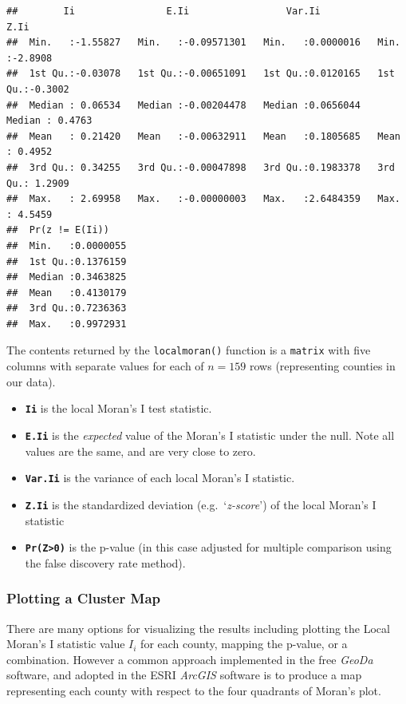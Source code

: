 \documentclass[
]{book}
\providecommand{\tightlist}{%
  \setlength{\itemsep}{0pt}\setlength{\parskip}{0pt}}
\begin{document}
\begin{verbatim}
##        Ii                E.Ii                 Var.Ii               Z.Ii        
##  Min.   :-1.55827   Min.   :-0.09571301   Min.   :0.0000016   Min.   :-2.8908  
##  1st Qu.:-0.03078   1st Qu.:-0.00651091   1st Qu.:0.0120165   1st Qu.:-0.3002  
##  Median : 0.06534   Median :-0.00204478   Median :0.0656044   Median : 0.4763  
##  Mean   : 0.21420   Mean   :-0.00632911   Mean   :0.1805685   Mean   : 0.4952  
##  3rd Qu.: 0.34255   3rd Qu.:-0.00047898   3rd Qu.:0.1983378   3rd Qu.: 1.2909  
##  Max.   : 2.69958   Max.   :-0.00000003   Max.   :2.6484359   Max.   : 4.5459  
##  Pr(z != E(Ii))     
##  Min.   :0.0000055  
##  1st Qu.:0.1376159  
##  Median :0.3463825  
##  Mean   :0.4130179  
##  3rd Qu.:0.7236363  
##  Max.   :0.9972931
\end{verbatim}

The contents returned by the \texttt{localmoran()} function is a \texttt{matrix} with five columns with separate values for each of \(n=159\) rows (representing counties in our data).

\begin{itemize}
\tightlist
\item
  \textbf{\texttt{Ii}} is the local Moran's I test statistic.\\
\item
  \textbf{\texttt{E.Ii}} is the \emph{expected} value of the Moran's I statistic under the null. Note all values are the same, and are very close to zero.
\item
  \textbf{\texttt{Var.Ii}} is the variance of each local Moran's I statistic.
\item
  \textbf{\texttt{Z.Ii}} is the standardized deviation (e.g.~`\emph{z-score}') of the local Moran's I statistic
\item
  \textbf{\texttt{Pr(Z\textgreater{}0)}} is the p-value (in this case adjusted for multiple comparison using the false discovery rate method).
\end{itemize}

\hypertarget{plotting-a-cluster-map}{%
\subsubsection{Plotting a Cluster Map}\label{plotting-a-cluster-map}}

There are many options for visualizing the results including plotting the Local Moran's I statistic value \(I_i\) for each county, mapping the p-value, or a combination. However a common approach implemented in the free \emph{GeoDa} software, and adopted in the ESRI \emph{ArcGIS} software is to produce a map representing each county with respect to the four quadrants of Moran's plot.
\end{document}
